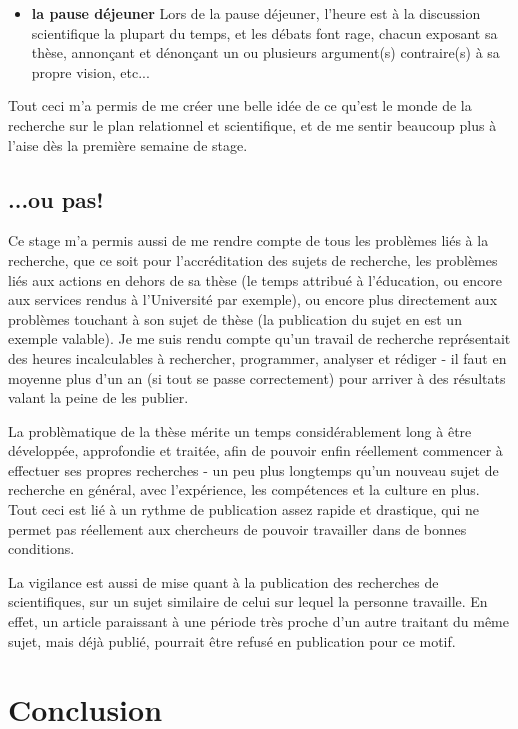 \documentclass[pdftex,12pt,a4paper]{report}
\begin{document}
\begin{spacing}{1.2}
\begin{itemize}
\item \textbf{la pause déjeuner}
	\newline
	Lors de la pause déjeuner, l'heure est à la discussion scientifique la plupart du temps, et les débats font rage, chacun exposant sa thèse, annonçant et dénonçant un ou plusieurs argument(s) contraire(s) à sa propre vision, etc...
\end{itemize}
Tout ceci m'a permis de me créer une belle idée de ce qu'est le monde de la recherche sur le plan relationnel et scientifique, et de me sentir beaucoup plus à l'aise dès la première semaine de stage.

\section{...ou pas!}

Ce stage m'a permis aussi de me rendre compte de tous les problèmes liés à la recherche, que ce soit pour l'accréditation des sujets de recherche, les problèmes liés aux actions en dehors de sa thèse (le temps attribué à l'éducation, ou encore aux services rendus à l'Université par exemple), ou encore plus directement aux problèmes touchant à son sujet de thèse (la publication du sujet en est un exemple valable).
\newline
Je me suis rendu compte qu'un travail de recherche représentait des heures incalculables à rechercher, programmer, analyser et rédiger - il faut en moyenne plus d'un an (si tout se passe correctement) pour arriver à des résultats valant la peine de les publier.

La problèmatique de la thèse mérite un temps considérablement long à être développée, approfondie et traitée, afin de pouvoir enfin réellement commencer à effectuer ses propres recherches - un peu plus longtemps qu'un nouveau sujet de recherche en général, avec l'expérience, les compétences et la culture en plus.
\newline
Tout ceci est lié à un rythme de publication assez rapide et drastique, qui ne permet pas réellement aux chercheurs de pouvoir travailler dans de bonnes conditions.

La vigilance est aussi de mise quant à la publication des recherches de scientifiques, sur un sujet similaire de celui sur lequel la personne travaille. En effet, un article paraissant à une période très proche d'un autre traitant du même sujet, mais déjà publié, pourrait être refusé en publication pour ce motif.

\chapter*{Conclusion}


\end{spacing}
\end{document}
